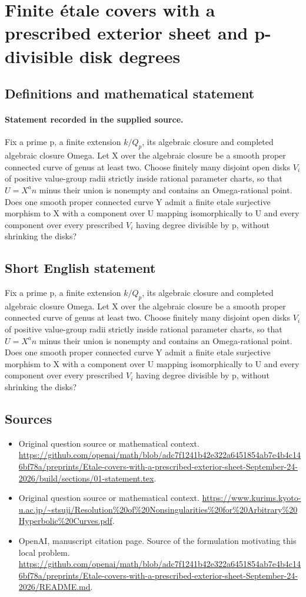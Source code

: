 \documentclass[11pt]{article}
\begin{document}
\section*{Finite étale covers with a prescribed exterior sheet and p-divisible disk degrees}\label{30007291}
\subsection{Definitions and mathematical statement}
\paragraph{Statement recorded in the supplied source.}
Fix a prime p, a finite extension $k/Q_p$, its algebraic closure and completed algebraic closure Omega. Let X over the algebraic closure be a smooth proper connected curve of genus at least two. Choose finitely many disjoint open disks $V_i$ of positive value-group radii strictly inside rational parameter charts, so that $U=X^an$ minus their union is nonempty and contains an Omega-rational point. Does one smooth proper connected curve Y admit a finite etale surjective morphism to X with a component over U mapping isomorphically to U and every component over every prescribed $V_i$ having degree divisible by p, without shrinking the disks?
\subsection{Short English statement}
Fix a prime p, a finite extension $k/Q_p$, its algebraic closure and completed algebraic closure Omega. Let X over the algebraic closure be a smooth proper connected curve of genus at least two. Choose finitely many disjoint open disks $V_i$ of positive value-group radii strictly inside rational parameter charts, so that $U=X^an$ minus their union is nonempty and contains an Omega-rational point. Does one smooth proper connected curve Y admit a finite etale surjective morphism to X with a component over U mapping isomorphically to U and every component over every prescribed $V_i$ having degree divisible by p, without shrinking the disks?
\subsection{Sources}
\begin{itemize}
\item[S1] Original question source or mathematical context.
\url{https://github.com/openai/math/blob/adc7f1241b42e322a6451854ab7e4b4c146bf78a/preprints/Etale-covers-with-a-prescribed-exterior-sheet-September-24-2026/build/sections/01-statement.tex}.
\item[S2] Original question source or mathematical context.
\url{https://www.kurims.kyoto-u.ac.jp/~stsuji/Resolution%20of%20Nonsingularities%20for%20Arbitrary%20Hyperbolic%20Curves.pdf}.
\item[S3] OpenAI, manuscript citation page. Source of the formulation motivating this local problem.
\url{https://github.com/openai/math/blob/adc7f1241b42e322a6451854ab7e4b4c146bf78a/preprints/Etale-covers-with-a-prescribed-exterior-sheet-September-24-2026/README.md}.
\end{itemize}
\end{document}
